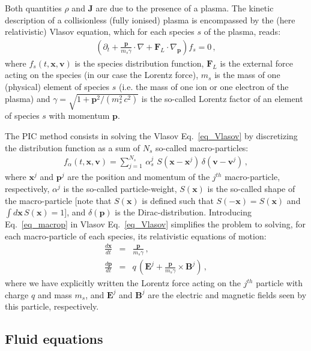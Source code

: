 \documentclass[11pt,a4paper]{article}
\newcommand{\vE}{\mathbf{E}}
\newcommand{\vB}{\mathbf{B}}
\newcommand{\vJ}{\mathbf{J}}
\newcommand{\vx}{\mathbf{x}}
\newcommand{\vp}{\mathbf{p}}
\newcommand{\vv}{\mathbf{v}}
\newcommand{\vF}{\mathbf{F}}
\begin{document}
Both quantities $\rho$ and $\vJ$ are due to the presence of a plasma.
The kinetic description of a collisionless (fully ionised) plasma is encompassed by the (here relativistic) Vlasov equation, which for each species $s$ of the plasma, reads:
\begin{eqnarray}\label{eq_Vlasov}
\left(\partial_t  + \frac{\vp}{m_s \gamma} \cdot \nabla + \vF_L \cdot \nabla_{\vp} \right) f_s = 0\,,
\end{eqnarray}
where $f_s(t,\vx,\vv)$ is the species distribution function, $\vF_L$ is the external force acting on the species (in our case the Lorentz force), $m_s$ is the mass of one (physical) element of species $s$ (i.e. the mass of one ion or one electron of the plasma) and $\gamma = \sqrt{1+\vp^2/(m_s^2\,c^2)}$ is the so-called Lorentz factor of an element of species $s$ with momentum $\vp$.

The PIC method consists in solving the Vlasov Eq.~\eqref{eq_Vlasov} by discretizing the distribution function as a sum of $N_s$ so-called macro-particles:
\begin{eqnarray}\label{eq_macrop}
f_\alpha (t,\vx,\vv) = \sum_{j=1}^{N_s}\,\alpha_s^j\,\,S(\vx-\vx^j)\,\delta(\vv-\vv^j)\,,
\end{eqnarray}
where $\vx^j$ and $\vp^j$ are the position and momentum of the $j^{th}$ macro-particle, respectively, $\alpha^j$ is the so-called particle-weight, $S(\vx)$ is the so-called shape of the macro-particle [note that $S(\vx)$ is defined such that $S(-\vx)=S(\vx)$ and $\int d\vx\,S(\vx)=1$], and $\delta(\vp)$ is the Dirac-distribution. Introducing Eq.~\eqref{eq_macrop} in Vlasov Eq.~\eqref{eq_Vlasov} simplifies the problem to solving, for each macro-particle of each species, its relativistic equations of motion:
\begin{subequations}
\begin{eqnarray}
\frac{d\vx}{dt}  &=& \frac{\vp}{m_s \gamma}\,,\\
\frac{d\vp}{dt}  &=&  q\,\left( \vE^j + \frac{\vp}{m_s \gamma} \times \vB^j \right)\,,
\end{eqnarray}
\end{subequations}
where we have explicitly written the Lorentz force acting on the $j^{th}$ particle with charge $q$ and mass $m_s$, and $\vE^j$ and $\vB^j$ are the electric and magnetic fields seen by this particle, respectively.

\subsection*{Fluid equations}
\end{document}
